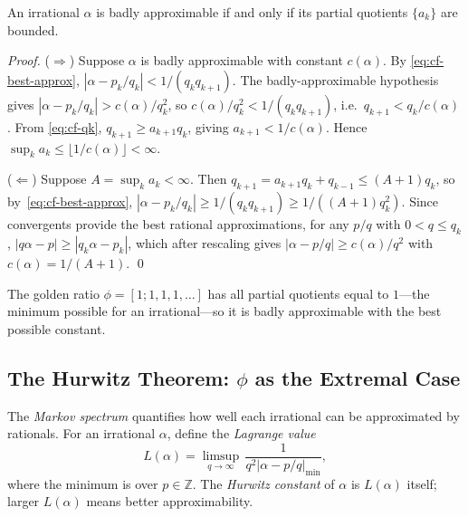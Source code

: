 \begin{theorem}
\label{thm:badly-approx-cf}
An irrational $\alpha$ is badly approximable if and
only if its partial quotients $\{a_k\}$ are bounded.
\end{theorem}

\begin{proof}
($\Rightarrow$)
Suppose $\alpha$ is badly approximable with constant
$c(\alpha)$.  By \eqref{eq:cf-best-approx},
$|\alpha - p_k/q_k| < 1/(q_k q_{k+1})$.
The badly-approximable hypothesis gives
$|\alpha - p_k/q_k| > c(\alpha)/q_k^2$,
so $c(\alpha)/q_k^2 < 1/(q_k q_{k+1})$,
i.e.\ $q_{k+1} < q_k/c(\alpha)$.
From \eqref{eq:cf-qk}, $q_{k+1} \geq a_{k+1} q_k$,
giving $a_{k+1} < 1/c(\alpha)$.
Hence $\sup_k a_k \leq \lfloor 1/c(\alpha) \rfloor < \infty$.

($\Leftarrow$)
Suppose $A = \sup_k a_k < \infty$.
Then $q_{k+1} = a_{k+1}q_k + q_{k-1} \leq (A+1)q_k$,
so by~\eqref{eq:cf-best-approx},
$|\alpha - p_k/q_k| \geq 1/(q_k q_{k+1})
 \geq 1/((A+1)q_k^2)$.
Since convergents provide the best rational
approximations, for any $p/q$ with $0 < q \leq q_k$,
$|q\alpha - p| \geq |q_k \alpha - p_k|$,
which after rescaling gives
$|\alpha - p/q| \geq c(\alpha)/q^2$
with $c(\alpha) = 1/(A+1)$.
\qed
\end{proof}

The golden ratio $\phi = [1;1,1,1,\ldots]$ has all
partial quotients equal to $1$---the minimum
possible for an irrational---so it is badly
approximable with the best possible constant.

\subsection{The Hurwitz Theorem: $\phi$ as the Extremal Case}
\label{sec:hurwitz-theorem}

The \emph{Markov spectrum} quantifies how well
each irrational can be approximated by rationals.
For an irrational $\alpha$, define the
\emph{Lagrange value}
\begin{equation}\label{eq:lagrange-value}
  L(\alpha) = \limsup_{q \to \infty}\,
  \frac{1}{q^2 \left|\alpha - p/q\right|_{\min}},
\end{equation}
where the minimum is over $p \in \mathbb{Z}$.
The \emph{Hurwitz constant} of $\alpha$ is
$L(\alpha)$ itself; larger $L(\alpha)$ means
better approximability.

